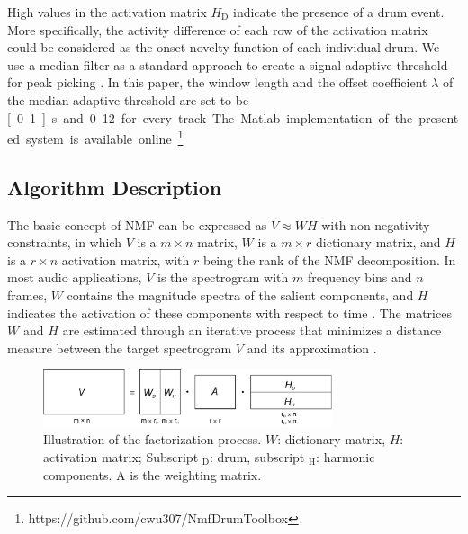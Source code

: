 \documentclass{article}
\begin{document}
High values in the activation matrix $H_\mathrm{D}$ indicate the presence of a drum event. More specifically, the activity difference of each row of the activation matrix could be considered as the onset novelty function of each individual drum. We use a median filter as a standard approach to create a signal-adaptive threshold for peak picking \cite{Lerch2012}. In this paper, the window length and the offset coefficient $\lambda$ of the median adaptive threshold are set to be \unit[0.1]{s} and 0.12 for every track. The Matlab implementation of the presented system is available online.\footnote{https://github.com/cwu307/NmfDrumToolbox}

\subsection{Algorithm Description}\label{subsec:algorithm}
The basic concept of NMF can be expressed as $V \approx WH$ with non-negativity constraints, in which $V$ is a $m \times n$ matrix, $W$ is a $m \times r$ dictionary matrix, and $H$ is a $r \times n$ activation matrix, with $r$ being the rank of the NMF decomposition. In most audio applications, $V$ is the spectrogram with $m$ frequency bins and $n$ frames, $W$ contains the magnitude spectra of the salient components, and $H$ indicates the activation of these components with respect to time \cite{smaragdis_non-negative_2003}. The matrices $W$ and $H$ are estimated through an iterative process that minimizes a distance measure between the target spectrogram $V$ and its approximation \cite{lee_algorithms_2000}. 

\begin{figure}
 \centering 
  \centerline{
 \includegraphics[width=8.5cm]{factorization.pdf}}
 \caption{Illustration of the factorization process. $W$: dictionary matrix, $H$: activation matrix; Subscript $_\mathrm{D}$: drum, subscript $_\mathrm{H}$: harmonic components. $\mathrm{A}$ is the weighting matrix. }
 \label{fig:factorization}
\end{figure}
\end{document}
